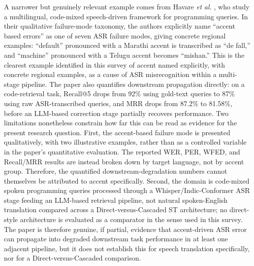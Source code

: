 A narrower but genuinely relevant example comes from Havare \textit{et al.} \cite{losttranscription2026}, who study a multilingual, code-mixed speech-driven framework for programming queries. In their qualitative failure-mode taxonomy, the authors explicitly name ``accent based errors'' as one of seven ASR failure modes, giving concrete regional examples: ``default'' pronounced with a Marathi accent is transcribed as ``de fall,'' and ``machine'' pronounced with a Telugu accent becomes ``mishan.'' This is the clearest example identified in this survey of accent named explicitly, with concrete regional examples, as a cause of ASR misrecognition within a multi-stage pipeline. The paper also quantifies downstream propagation directly: on a code-retrieval task, Recall@5 drops from 92\% using gold-text queries to 87\% using raw ASR-transcribed queries, and MRR drops from 87.2\% to 81.58\%, before an LLM-based correction stage partially recovers performance. Two limitations nonetheless constrain how far this can be read as evidence for the present research question. First, the accent-based failure mode is presented qualitatively, with two illustrative examples, rather than as a controlled variable in the paper's quantitative evaluation. The reported WER, PER, WFED, and Recall/MRR results are instead broken down by target language, not by accent group. Therefore, the quantified downstream-degradation numbers cannot themselves be attributed to accent specifically. Second, the domain is code-mixed spoken programming queries processed through a Whisper/Indic-Conformer ASR stage feeding an LLM-based retrieval pipeline, not natural spoken-English translation compared across a Direct-versus-Cascaded ST architecture; no direct-style architecture is evaluated as a comparator in the sense used in this survey. The paper is therefore genuine, if partial, evidence that accent-driven ASR error can propagate into degraded downstream task performance in at least one adjacent pipeline, but it does not establish this for speech translation specifically, nor for a Direct-versus-Cascaded comparison.

